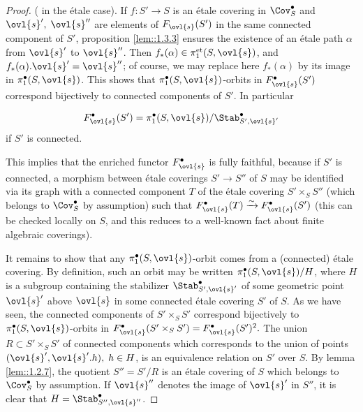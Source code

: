 \begin{proof}
 (\cf \cite[2.10]{efgonas} in the \'etale case). If
 $f:S'\to S$ is an \'etale covering in $\Cov^\bullet_S$ and
 $\ovl{s}',\;\ovl{s}''$ are elements of $F_{\ovl{s}}(S')$ in the same
 connected component of $S'$, proposition \ref{lem::1.3.3} ensures the existence of
 an \'etale path $\alpha$ from $\ovl{s}'$ to $\ovl{s}''$. Then
 $f_\ast(\alpha)\in \pi_1^{\mathrm{et}}(S,\ovl{s})$, and
 $f_\ast(\alpha).\ovl{s}'=\ovl{s}''$; of course, we may replace here
 $f_\ast(\alpha)$ by its image in $\pi_1^\bullet(S,\ovl{s})$. This shows
 that $\pi_1^\bullet(S,\ovl{s})$-orbits in $F^\bullet_{\ovl{s}}(S')$
 correspond bijectively to connected components of $S'$. In particular

 \begin{equation*}
 F^\bullet_{\ovl{s}}(S') = 
  \pi_1^\bullet(S,\ovl{s})/{\Stab^\bullet_{S',\ovl{s}'}}
 \end{equation*}
 if $S'$ is connected.

 This implies that the enriched functor $F^\bullet_{\ovl{s}}$ is fully
 faithful, because if $S'$ is connected, a morphism between \'etale
 coverings $S'\to S''$ of $S$ may be identified via its graph with a
 connected component $T$ of the \'etale covering $S'\times_S S''$ (which
 belongs to $\Cov^\bullet_S$ by assumption) such that
 $F^\bullet_{\ovl{s}}(T)\xrightarrow{\sim}
 F^\bullet_{\ovl{s}}(S')$ (this can be checked locally on $S$, and this
 reduces to a well-known fact about finite algebraic coverings).

 It remains to show that any $\pi_1^\bullet(S,\ovl{s})$-orbit comes from
 a (connected) \'etale covering. By definition, such an orbit may be
 written $ \pi_1^\bullet(S,\ovl{s})/H$, where $H$ is a subgroup
 containing the stabilizer ${\Stab^\bullet_{S',\ovl{s}'}}$ of some
 geometric point $\ovl{s}'$ above $\ovl{s}$ in some connected \'etale
 covering $S'$ of $S$. As we have seen, the connected components of
 $S'\times_S S'$ correspond bijectively to
 $\pi_1^\bullet(S,\ovl{s})$-orbits in $F^\bullet_{\ovl{s}}(S'\times_S
 S')= F^\bullet_{\ovl{s}}(S')^2.$ The union $R\subset S'\times_S S'$ of
 connected components which corresponds to the union of points
 $(\ovl{s}',\ovl{s}'.h),\;h\in H$, is an equivalence relation on $S'$
 over $S$. By lemma \ref{lem::1.2.7}, the quotient $S''=S'/R$ is an
 \'etale covering 
 of $S$ which belongs to $\Cov^\bullet_S$ by assumption. If $\ovl{s}''$
 denotes the image of $\ovl{s}'$ in $S''$, it is clear that
 $H=\Stab^\bullet_{S'',\ovl{s}''}$.
\end{proof}

